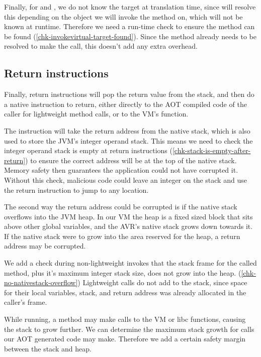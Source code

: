 Finally, for  and , we do not know the target at translation time, since  will resolve this depending on the object we will invoke the method on, which will not be known at runtime. Therefore we need a run-time check to ensure the method can be found (\ref{chk-invokevirtual-target-found}). Since the method already needs to be resolved to make the call, this doesn't add any extra overhead.

\subsection{Return instructions}
Finally, return instructions will pop the return value from the stack, and then do a native  instruction to return, either directly to the AOT compiled code of the caller for lightweight method calls, or to the VM's  function.

The  instruction will take the return address from the native stack, which is also used to store the JVM's integer operand stack. This means we need to check the integer operand stack is empty at return instructions (\ref{chk-stack-is-empty-after-return}) to ensure the correct address will be at the top of the native stack. Memory safety then guarantees the application could not have corrupted it. Without this check, malicious code could leave an integer on the stack and use the return instruction to jump to any location.

The second way the return address could be corrupted is if the native stack overflows into the JVM heap. In our VM the heap is a fixed sized block that sits above other global variables, and the AVR's native stack grows down towards it. If the native stack were to grow into the area reserved for the heap, a return address may be corrupted.

We add a check during non-lightweight invokes that the stack frame for the called method, plus it's maximum integer stack size, does not grow into the heap. (\ref{chk-no-nativestack-overflow}) Lightweight calls do not add to the stack, since space for their local variables, stack, and return address was already allocated in the caller's frame.

While running, a method may make calls to the VM or libc functions, causing the stack to grow further. We can determine the maximum stack growth for calls our AOT generated code may make. Therefore we add a certain safety margin between the stack and heap.

